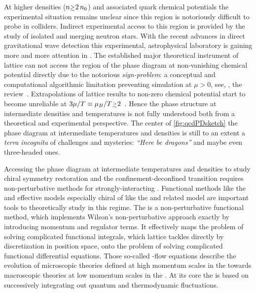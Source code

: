 At higher densities ($n\smallergtrsim 2\,n_0$) and associated quark chemical potentials the experimental situation remains unclear since this region is notoriously difficult to probe in colliders.
Indirect experimental access to this region is provided by the study of isolated and merging neutron stars.
With the recent advances in direct gravitational wave detection this experimental, astrophysical laboratory is gaining more and more attention in \hep{}.
The established major theoretical instrument of lattice \qcd{} can not access the region of the \qcd{} phase diagram at non-vanishing chemical potential directly due to the notorious \textit{\qcd{} sign-problem}: a conceptual and computational algorithmic limitation preventing simulation at $\mu>0$, see, \eg{}, the review~\cite{deForcrand:2010ys}.
Extrapolations of lattice \qcd{} results to non-zero chemical potential start to become unreliable at $3\mu/T\equiv \mu_B/T\smallergtrsim 2$~\cite{Fu:2019hdw,Bellwied:2015rza,HotQCD:2018pds}.
Hence the phase structure at intermediate densities and temperatures is not fully understood both from a theoretical and experimental perspective.
The center of \cref{fig:qcdPDsketch} \dash{} the \qcd{} phase diagram at intermediate temperatures and densities \dash{} is still to an extent a \textit{terra incognita} of challenges and mysteries: \textit{``Here be dragons''} and maybe even three-headed ones.

Accessing the \qcd{} phase diagram at intermediate temperatures and densities to study chiral symmetry restoration and the confinement-deconfined transition requires non-perturbative methods for strongly-interacting \qcd{}.
Functional methods \dash{} like the  \dash{}  and effective models \dash{} especially chiral \loefts{} of \qcd{} like the \njlm{} and related  model \dash{} are important tools to theoretically study \qcd{} in this regime.
The \frg{} is a non-perturbative functional method, which implements Wilson's non-perturbative  approach exactly by introducing momentum and \rgscaledependent{} regulator terms.
It effectively maps the problem of solving complicated functional integrals, which lattice \qcd{} tackles directly by discretization in position space, onto the problem of solving complicated functional differential equations.
Those so-called \rg{}-flow equations describe the evolution of microscopic theories defined at high momentum scales \dash{} in the \uv{} \dash{} towards macroscopic theories at low momentum scales \dash{} in the \ir{}.
At its core the \frg{} is based on successively integrating out quantum and thermodynamic fluctuations.
 
